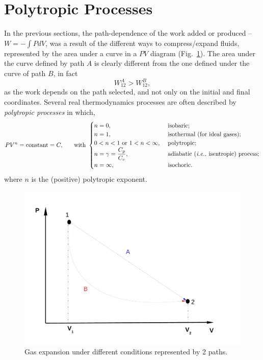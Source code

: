    \section{Polytropic Processes}\label{Chapter:FirstLaw:Section:PolytropicProcesses}
   In the previous sections, the path-dependence of the work added or produced -- $W=-\int PdV$, was a result of the different ways to compress/expand fluids, represented by the area under a curve in a $PV$ diagram (Fig.~\ref{Chapter:FirstLaw:Fig:Work_PV}). The area under the curve defined by path $A$ is clearly different from the one defined under the curve of path $B$, in fact
   \begin{displaymath}
     W_{12}^{A} > W_{12}^{B},
   \end{displaymath}
   as the work depends on the path selected, and not only on the initial and final coordinates. Several real thermodynamics processes are often described by {\it polytropic processes} in which,
   \begin{equation}
     PV^{n} = \text{constant} = C, \hspace{.5cm} \text{ with }\label{Chapter:FirstLaw:Eqn:PolytropicProcess}
     \begin{cases}
       n = 0,  & \text{ isobaric;}\\
       n = 1, & \text{ isothermal (for ideal gases);} \\
       0 < n < 1 \text{ or } 1 < n < \infty, & \text{ polytropic;} \\
       n = \gamma = \displaystyle\frac{C_{p}}{C_{v}}, & \text{ adiabatic ({\it i.e., }isentropic) process;}\\
       n = \infty, & \text{ isochoric.}
     \end{cases}
   \end{equation}
   where $n$ is the (positive) polytropic exponent.
   
\begin{figure}[h]
  \vbox{
     \hbox{\hspace{2cm}\includegraphics[width=0.7\columnwidth,clip]{./Figs/Chp3_PistonCylinder_PV}}}
        \caption{Gas expansion under different conditions represented by 2 paths.}\label{Chapter:FirstLaw:Fig:Work_PV}
   \end{figure}

